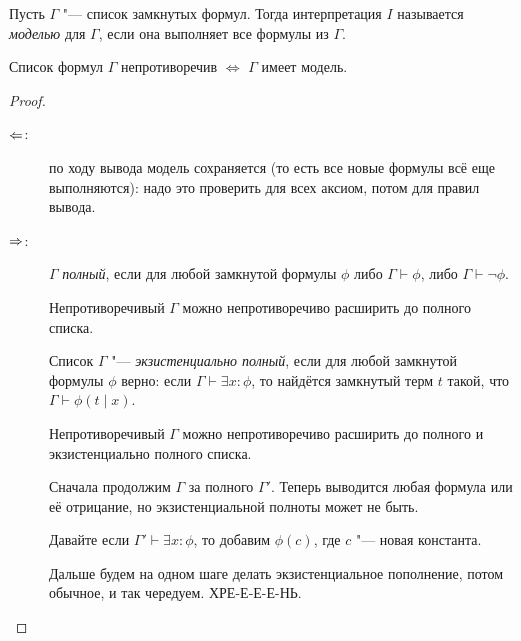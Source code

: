 \begin{Def}
	Пусть $\Gamma$ "--- список замкнутых формул.
	Тогда интерпретация $I$ называется \textsl{моделью} для $\Gamma$, если
	она выполняет все формулы из $\Gamma$.
\end{Def}
\begin{theorem}
	Список формул $\Gamma$ непротиворечив $\iff$ $\Gamma$ имеет модель.
\end{theorem}
\begin{proof}
	\begin{description}
		\item[$\Leftarrow$:]
			по ходу вывода модель сохраняется (то есть все новые формулы всё еще выполняются):
			надо это проверить для всех аксиом, потом для правил вывода.
		\item[$\Rightarrow$:]
			\begin{Def}
				$\Gamma$ \textsl{полный}, если для любой замкнутой формулы $\phi$
				либо $\Gamma \vdash \phi$, либо $\Gamma \vdash \lnot \phi$.
			\end{Def}
			\begin{lemma}
				Непротиворечивый $\Gamma$ можно непротиворечиво расширить до полного списка.
			\end{lemma}
			\begin{Def}
				Список $\Gamma$ "--- \textsl{экзистенциально полный}, если для любой замкнутой формулы $\phi$
				верно: если $\Gamma \vdash \exists x \colon \phi$, то найдётся замкнутый терм $t$ такой,
				что $\Gamma \vdash \phi(t \mid x)$.
			\end{Def}
			\begin{lemma}
				Непротиворечивый $\Gamma$ можно непротиворечиво расширить до полного и экзистенциально полного списка.
			\end{lemma}
			\begin{Def}
				Сначала продолжим $\Gamma$ за полного $\Gamma'$.
				Теперь выводится любая формула или её отрицание, но экзистенциальной полноты может не быть.

				Давайте если $\Gamma' \vdash \exists x \colon \phi$, то добавим $\phi(c)$, где $c$ "--- новая константа.

				\TODO
				Дальше будем на одном шаге делать экзистенциальное пополнение, потом обычное, и так чередуем.
				ХРЕ-Е-Е-Е-НЬ.
			\end{Def}
	\end{description}
\end{proof}
